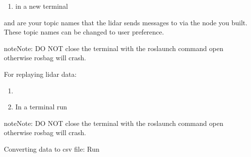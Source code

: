 \documentclass[letterpaper,10pt,english]{sphinxmanual}
\begin{document}


\begin{enumerate}
\def\theenumi{\arabic{enumi}}
\def\labelenumi{\theenumi .}
\makeatletter\def\p@enumii{\p@enumi \theenumi .}\makeatother
\setcounter{enumi}{1}
\item {} 
 in a new terminal

\end{enumerate}

 and  are your topic names that the lidar sends messages to via the node you built. These topic names can be changed to user preference.

\begin{sphinxadmonition}{note}{Note:}
DO NOT close the terminal with the roslaunch command open otherwise rosbag will crash.
\end{sphinxadmonition}

For replaying lidar data:
\begin{enumerate}
\def\theenumi{\arabic{enumi}}
\def\labelenumi{\theenumi .}
\makeatletter\def\p@enumii{\p@enumi \theenumi .}\makeatother
\item {} 

\item {} 
In a  terminal run 

\end{enumerate}

\begin{sphinxadmonition}{note}{Note:}
DO NOT close the terminal with the roslaunch command open otherwise rosbag will crash.
\end{sphinxadmonition}

Converting data to csv file: Run 
\end{document}
